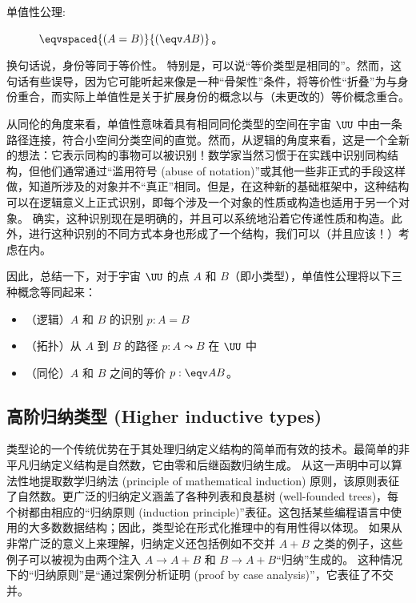 \begin{description}%
\item[单值性公理:]  $\eqvspaced{(A = B)}{(\eqv A B)}$。
\end{description}
%
换句话说，身份等同于等价性。
特别是，可以说“等价类型是相同的”。然而，这句话有些误导，因为它可能听起来像是一种“骨架性”条件，将等价性“折叠”为与身份重合，而实际上单值性是关于扩展身份的概念以与（未更改的）等价概念重合。

从同伦的角度来看，单值性意味着具有相同同伦类型的空间在宇宙 $\UU$ 中由一条路径连接，符合小空间分类空间的直觉。然而，从逻辑的角度来看，这是一个全新的想法：它表示同构的事物可以被识别！数学家当然习惯于在实践中识别同构结构，但他们通常通过“滥用符号 (abuse of notation)”或其他一些非正式的手段这样做，知道所涉及的对象并不“真正”相同。但是，在这种新的基础框架中，这种结构可以在逻辑意义上正式识别，即每个涉及一个对象的性质或构造也适用于另一个对象。
确实，这种识别现在是明确的，并且可以系统地沿着它传递性质和构造。此外，进行这种识别的不同方式本身也形成了一个结构，我们可以（并且应该！）考虑在内。

因此，总结一下，对于宇宙 $\UU$ 的点 $A$ 和 $B$（即小类型），单值性公理将以下三种概念等同起来：
\begin{itemize}
    \item （逻辑）$A$ 和 $B$ 的识别 $p:A=B$
    \item （拓扑）从 $A$ 到 $B$ 的路径 $p:A \leadsto B$ 在 $\UU$ 中
    \item （同伦）$A$ 和 $B$ 之间的等价 $p:\eqv A B$。
\end{itemize}

\subsection*{高阶归纳类型 (Higher inductive types)}%

类型论的一个传统优势在于其处理归纳定义结构的简单而有效的技术。最简单的非平凡归纳定义结构是自然数，它由零和后继函数归纳生成。
从这一声明中可以算法性地提取数学归纳法 (principle of mathematical induction) 原则，该原则表征了自然数。更广泛的归纳定义涵盖了各种列表和良基树 (well-founded trees)，每个树都由相应的“归纳原则 (induction principle)”表征。这包括某些编程语言中使用的大多数数据结构；因此，类型论在形式化推理中的有用性得以体现。
如果从非常广泛的意义上来理解，归纳定义还包括例如不交并 $A+B$ 之类的例子，这些例子可以被视为由两个注入 $A\to A+B$ 和 $B\to A+B$“归纳”生成的。
这种情况下的“归纳原则”是“通过案例分析证明 (proof by case analysis)”，它表征了不交并。

